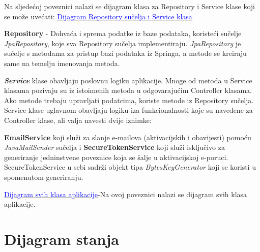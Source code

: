     Na sljedećoj poveznici nalazi se dijagram klasa za Repository i Service klase koji se može uvećati: \href{https://drive.google.com/file/d/1SzOhj1Bq-YyAUKqIZqTj0oUILVQYDE_b/view?usp=sharing}{\textcolor{blue}{Dijagram Repository sučelja i Service klasa}}
    
    
    \textbf{Repository} - Dohvaća i sprema podatke iz baze podataka, koristeći  sučelje \textit{JpaRepository}, koje sva Repository sučelja implementiraju. \textit{JpaRepository} je sučelje s metodama za pristup bazi podataka iz Springa, a metode se kreiraju same na temelju imenovanja metoda.
    
    \textbf{\textit{Service}} klase obavljaju poslovnu logiku aplikacije. Mnoge od metoda u Service klasama pozivaju su iz istoimenih metoda u odgovarajućim Controller klasama. Ako metode trebaju upravljati podatcima, koriste metode iz Repository sučelja.  Service klase uglavnom obavljaju logiku iza funkcionalnosti koje su navedene za Controller klase, ali valja navesti dvije iznimke:
    
    \textbf{EmailService} koji služi za slanje e-mailova (aktivacijskih i obavijesti) pomoću \textit{JavaMailSender} sučelja i
    \textbf{SecureTokenService} koji služi isključivo za generiranje jedninstvene poveznice koja se šalje u aktivacijskoj e-poruci. SecureTokenService u sebi sadrži objekt tipa \textit{BytesKeyGenerator} koji se koristi u spomenutom generiranju.
    
    \href{https://drive.google.com/file/d/1oA-XBPEW6Ks2GIoX5Iqn9XRFGumoSmCd/view?usp=sharing}{\textcolor{blue}{Dijagram svih klasa aplikacije}}-Na ovoj poveznici nalazi se dijagram svih klasa aplikacije.


			
			
			
			
			
		    
		
		
\section{Dijagram stanja}
			
